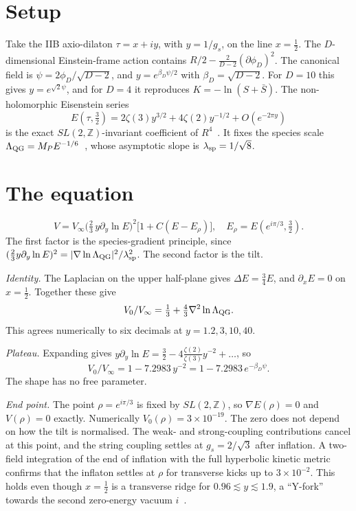 \documentclass[aps,prd,twocolumn,superscriptaddress,nofootinbib,showkeys]{revtex4-2}
\begin{document}
\section{Setup}
Take the IIB axio-dilaton $\tau=x+iy$, with $y=1/g_s$, on the line $x=\tfrac12$. The $D$-dimensional Einstein-frame action contains $R/2-\tfrac{2}{D-2}(\partial\phi_D)^2$. The canonical field is $\psi=2\phi_D/\sqrt{D-2}$, and $y=e^{\beta_D\psi/2}$ with $\beta_D=\sqrt{D-2}$. For $D=10$ this gives $y=e^{\sqrt2\psi}$, and for $D=4$ it reproduces $K=-\ln(S+\bar S)$. The non-holomorphic Eisenstein series
\begin{equation}
E(\tau,\tfrac32)=2\zeta(3)y^{3/2}+4\zeta(2)y^{-1/2}+O(e^{-2\pi y})
\end{equation}
is the exact $SL(2,\mathbb Z)$-invariant coefficient of $R^4$~\cite{GG}. It fixes the species scale $\Lambda_{\rm QG}=M_PE^{-1/6}$~\cite{vdH}, whose asymptotic slope is $\lambda_{\rm sp}=1/\sqrt8$.

\section{The equation}
\begin{equation}
V=V_\infty\Big(\tfrac23\,y\partial_y\ln E\Big)^2\big[1+C(E-E_\rho)\big],\quad E_\rho=E(e^{i\pi/3},\tfrac32).
\label{eq:V}
\end{equation}
The first factor is the species-gradient principle, since $(\tfrac23y\partial_y\ln E)^2=|\nabla\ln\Lambda_{\rm QG}|^2/\lambda_{\rm sp}^2$. The second factor is the tilt.

\emph{Identity.} The Laplacian on the upper half-plane gives $\Delta E=\tfrac34E$, and $\partial_xE=0$ on $x=\tfrac12$. Together these give
\begin{equation}
V_0/V_\infty=\tfrac13+\tfrac43\nabla^2\ln\Lambda_{\rm QG}.
\end{equation}
This agrees numerically to six decimals at $y=1.2,3,10,40$.

\emph{Plateau.} Expanding gives $y\partial_y\ln E=\tfrac32-4\frac{\zeta(2)}{\zeta(3)}y^{-2}+\dots$, so
\begin{equation}
V_0/V_\infty=1-7.2983\,y^{-2}=1-7.2983\,e^{-\beta_D\psi}.
\end{equation}
The shape has no free parameter.

\emph{End point.} The point $\rho=e^{i\pi/3}$ is fixed by $SL(2,\mathbb Z)$, so $\nabla E(\rho)=0$ and $V(\rho)=0$ exactly. Numerically $V_0(\rho)=3\times10^{-19}$. The zero does not depend on how the tilt is normalised. The weak- and strong-coupling contributions cancel at this point, and the string coupling settles at $g_s=2/\sqrt3$ after inflation. A two-field integration of the end of inflation with the full hyperbolic kinetic metric confirms that the inflaton settles at $\rho$ for transverse kicks up to $3\times10^{-2}$. This holds even though $x=\tfrac12$ is a transverse ridge for $0.96\lesssim y\lesssim1.9$, a ``Y-fork'' towards the second zero-energy vacuum $i$~\cite{P2}.
\end{document}
